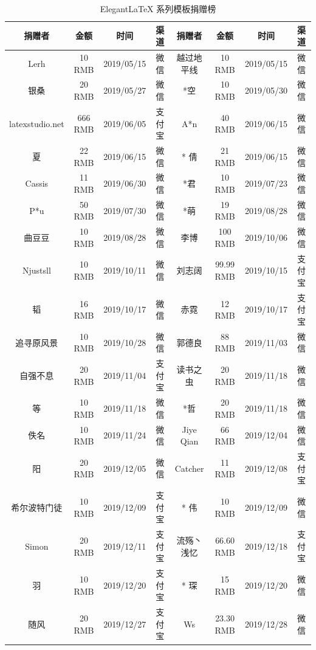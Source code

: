 \documentclass[lang=cn,11pt,a4paper,cite=authoryear]{elegantpaper}
\begin{document}
\begin{table}[!htb]
  \centering
  \caption{Elegant\LaTeX{} 系列模板捐赠榜}
    \begin{tabular}{*{4}{>{\scriptsize}c}|*{4}{>{\scriptsize}c}}
    \hline
    \textbf{捐赠者} & \textbf{金额} & \textbf{时间} & \textbf{渠道} & \textbf{捐赠者} & \textbf{金额} & \textbf{时间} & \textbf{渠道} \\
    \hline
    Lerh  & 10 RMB & 2019/05/15 & 微信    & 越过地平线 & 10 RMB & 2019/05/15 & 微信 \\
    银桑    & 20 RMB & 2019/05/27 & 微信    & *空    & 10 RMB & 2019/05/30 & 微信 \\
    latexstudio.net & 666 RMB & 2019/06/05 & 支付宝   & A*n   & 40 RMB & 2019/06/15 & 微信 \\
    * 夏   & 22 RMB & 2019/06/15 & 微信    & * 倩   & 21 RMB  & 2019/06/15 & 微信 \\
    Cassis & 11 RMB & 2019/06/30 & 微信    & *君    & 10 RMB & 2019/07/23 & 微信 \\
    P*u   & 50 RMB & 2019/07/30 & 微信    & *萌    & 19 RMB & 2019/08/28 & 微信 \\
    曲豆豆   & 10 RMB & 2019/08/28 & 微信    & 李博    & 100 RMB & 2019/10/06 & 微信 \\
    Njustsll & 10 RMB & 2019/10/11 & 微信    & 刘志阔   & 99.99 RMB & 2019/10/15 & 支付宝 \\
    * 韬   & 16 RMB & 2019/10/17 & 微信    & 赤霓    & 12 RMB & 2019/10/17 & 支付宝 \\
    追寻原风景 & 10 RMB & 2019/10/28 & 微信    & 郭德良   & 88 RMB & 2019/11/03 & 微信 \\
    自强不息  & 20 RMB & 2019/11/04 & 支付宝   & 读书之虫  & 20 RMB & 2019/11/18 & 微信 \\
    *等    & 10 RMB & 2019/11/18 & 微信    & *哲    & 20 RMB & 2019/11/18 & 微信 \\
    佚名    & 10 RMB & 2019/11/24 & 微信    & Jiye Qian & 66 RMB & 2019/12/04 & 微信 \\
    * 阳   & 20 RMB & 2019/12/05 & 微信    & Catcher & 11 RMB & 2019/12/08 & 支付宝 \\
    希尔波特门徒 & 10 RMB & 2019/12/09 & 支付宝   & * 伟   & 10 RMB & 2019/12/09 & 微信 \\
    Simon & 20 RMB & 2019/12/11 & 支付宝   & 流殇丶浅忆 & 66.60 RMB & 2019/12/18 & 支付宝 \\
    羽     & 10 RMB & 2019/12/20 & 支付宝   & * 琛   & 15 RMB & 2019/12/20 & 微信 \\
    随风    & 20 RMB & 2019/12/27 & 支付宝   & Ws    & 23.30 RMB & 2019/12/28 & 微信 \\

\end{tabular}
\end{table}
\end{document}
